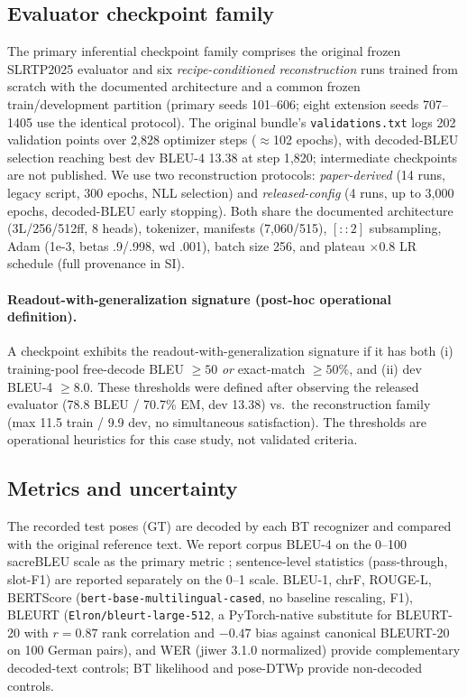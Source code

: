 \documentclass[pdflatex,sn-chicago]{sn-jnl}
\begin{document}
\subsection{Evaluator checkpoint family}
The primary inferential checkpoint family comprises the original frozen SLRTP2025 evaluator and six \emph{recipe-conditioned reconstruction} runs trained from scratch with the documented architecture and a common frozen train/development partition (primary seeds 101--606; eight extension seeds 707--1405 use the identical protocol). The original bundle's \texttt{validations.txt} logs 202 validation points over 2{,}828 optimizer steps ($\approx$102 epochs), with decoded-BLEU selection reaching best dev BLEU-4 13.38 at step 1{,}820; intermediate checkpoints are not published. We use two reconstruction protocols: \emph{paper-derived} (14 runs, legacy script, 300 epochs, NLL selection) and \emph{released-config} (4 runs, up to 3{,}000 epochs, decoded-BLEU early stopping). Both share the documented architecture (3L/256/512ff, 8 heads), tokenizer, manifests (7{,}060/515), $[::2]$ subsampling, Adam (1e-3, betas .9/.998, wd .001), batch size 256, and plateau $\times0.8$ LR schedule (full provenance in SI).

\paragraph{Readout-with-generalization signature (post-hoc operational definition).}
\label{sec:readout_def}
A checkpoint exhibits the readout-with-generalization signature if it has both (i) training-pool free-decode BLEU $\geq 50$ \emph{or} exact-match $\geq 50\%$, and (ii) dev BLEU-4 $\geq 8.0$. These thresholds were defined after observing the released evaluator (78.8 BLEU / 70.7\% EM, dev 13.38) vs.\ the reconstruction family (max 11.5 train / 9.9 dev, no simultaneous satisfaction). The thresholds are operational heuristics for this case study, not validated criteria.

\subsection{Metrics and uncertainty}
The recorded test poses (GT) are decoded by each BT recognizer and compared with the original reference text. We report corpus BLEU-4 on the 0--100 sacreBLEU scale as the primary metric \cite{post2018sacrebleu}; sentence-level statistics (pass-through, slot-F1) are reported separately on the 0--1 scale. BLEU-1, chrF, ROUGE-L, BERTScore \cite{zhang2020bertscore} (\texttt{bert-base-multilingual-cased}, no baseline rescaling, F1), BLEURT \cite{sellam2020bleurt} (\texttt{Elron/bleurt-large-512}, a PyTorch-native substitute for BLEURT-20 with $r=0.87$ rank correlation and $-0.47$ bias against canonical BLEURT-20 on 100 German pairs), and WER (jiwer 3.1.0 normalized) provide complementary decoded-text controls; BT likelihood and pose-DTWp provide non-decoded controls.
\end{document}
